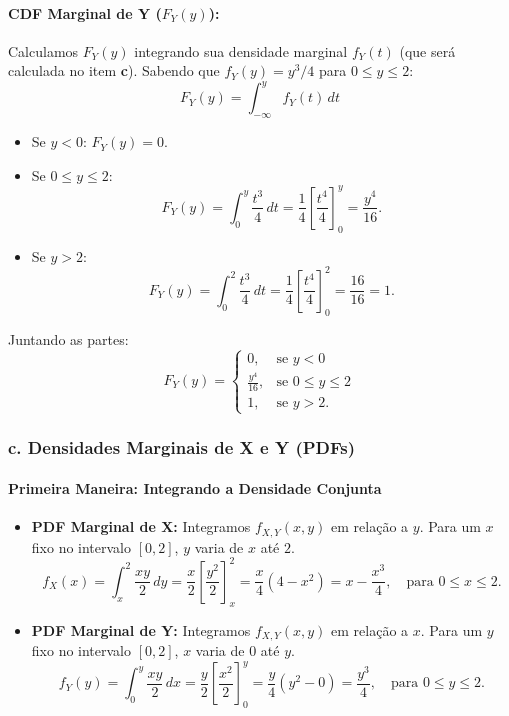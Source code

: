 \documentclass[12pt]{article}
\begin{document}
\paragraph{CDF Marginal de Y ($F_Y(y)$):}
Calculamos $F_Y(y)$ integrando sua densidade marginal $f_Y(t)$ (que será calculada no item \textbf{c}).
Sabendo que $f_Y(y) = y^3/4$ para $0 \le y \le 2$:
\[ F_Y(y) = \int_{-\infty}^{y} f_Y(t) \,dt \]
\begin{itemize}
    \item Se $y < 0$: $F_Y(y) = 0$.
    \item Se $0 \le y \le 2$:
    \[ F_Y(y) = \int_0^y \frac{t^3}{4} \,dt = \frac{1}{4} \left[ \frac{t^4}{4} \right]_0^y = \frac{y^4}{16}. \]
    \item Se $y > 2$:
    \[ F_Y(y) = \int_0^2 \frac{t^3}{4} \,dt = \frac{1}{4} \left[ \frac{t^4}{4} \right]_0^2 = \frac{16}{16} = 1. \]
\end{itemize}
Juntando as partes:
\[ F_Y(y) = \begin{cases} 0, & \text{se } y < 0 \\ \frac{y^4}{16}, & \text{se } 0 \le y \le 2 \\ 1, & \text{se } y > 2. \end{cases} \]

\subsubsection*{c. Densidades Marginais de X e Y (PDFs)}

\paragraph{Primeira Maneira: Integrando a Densidade Conjunta}
\begin{itemize}
    \item \textbf{PDF Marginal de X:} Integramos $f_{X,Y}(x,y)$ em relação a $y$. Para um $x$ fixo no intervalo $[0,2]$, $y$ varia de $x$ até $2$.
    \[ f_X(x) = \int_x^2 \frac{xy}{2} \,dy = \frac{x}{2} \left[ \frac{y^2}{2} \right]_x^2 = \frac{x}{4} (4 - x^2) = x - \frac{x^3}{4}, \quad \text{para } 0 \le x \le 2. \]
    \item \textbf{PDF Marginal de Y:} Integramos $f_{X,Y}(x,y)$ em relação a $x$. Para um $y$ fixo no intervalo $[0,2]$, $x$ varia de $0$ até $y$.
    \[ f_Y(y) = \int_0^y \frac{xy}{2} \,dx = \frac{y}{2} \left[ \frac{x^2}{2} \right]_0^y = \frac{y}{4} (y^2 - 0) = \frac{y^3}{4}, \quad \text{para } 0 \le y \le 2. \]
\end{itemize}
\end{document}
